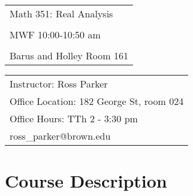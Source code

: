 \documentclass[11pt]{article}
\begin{document}
\begin{tabular}{ l }
 \LARGE Math 351: Real Analysis \\\\
 \LARGE MWF 10:00-10:50 am \\\\
 \LARGE Barus and Holley Room 161
\end{tabular}
\vspace{10mm}

\begin{tabular}{ l }
   \large Instructor: Ross Parker \\
   \large Office Location: 182 George St, room 024 \\
   \large Office Hours: TTh 2 - 3:30 pm \\
   \large ross\_parker@brown.edu \\
\end{tabular}
\vspace{5mm}

\section*{Course Description}
\end{document}

